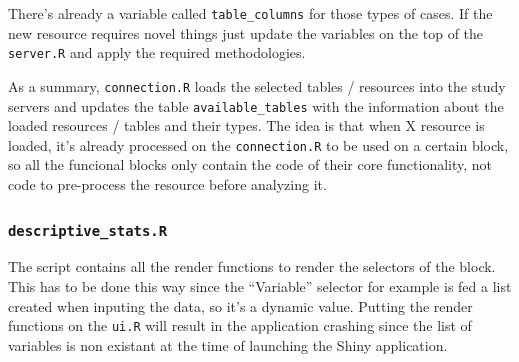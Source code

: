 \documentclass[
]{book}
\newenvironment{Shaded}{\begin{snugshade}}{\end{snugshade}}
\newcommand{\CommentTok}[1]{\textcolor[rgb]{0.56,0.35,0.01}{\textit{#1}}}
\newcommand{\ControlFlowTok}[1]{\textcolor[rgb]{0.13,0.29,0.53}{\textbf{#1}}}
\newcommand{\DataTypeTok}[1]{\textcolor[rgb]{0.13,0.29,0.53}{#1}}
\newcommand{\ErrorTok}[1]{\textcolor[rgb]{0.64,0.00,0.00}{\textbf{#1}}}
\newcommand{\KeywordTok}[1]{\textcolor[rgb]{0.13,0.29,0.53}{\textbf{#1}}}
\newcommand{\NormalTok}[1]{#1}
\newcommand{\OperatorTok}[1]{\textcolor[rgb]{0.81,0.36,0.00}{\textbf{#1}}}
\newcommand{\StringTok}[1]{\textcolor[rgb]{0.31,0.60,0.02}{#1}}
\begin{document}
\begin{Shaded}
\end{Shaded}

There's already a variable called \texttt{table\_columns} for those types of cases. If the new resource requires novel things just update the variables on the top of the \texttt{server.R} and apply the required methodologies.

As a summary, \texttt{connection.R} loads the selected tables / resources into the study servers and updates the table \texttt{available\_tables} with the information about the loaded resources / tables and their types. The idea is that when X resource is loaded, it's already processed on the \texttt{connection.R} to be used on a certain block, so all the funcional blocks only contain the code of their core functionality, not code to pre-process the resource before analyzing it.

\hypertarget{descriptive_stats.r}{%
\subsubsection{\texorpdfstring{\texttt{descriptive\_stats.R}}{descriptive\_stats.R}}\label{descriptive_stats.r}}

The script contains all the render functions to render the selectors of the block. This has to be done this way since the ``Variable'' selector for example is fed a list created when inputing the data, so it's a dynamic value. Putting the render functions on the \texttt{ui.R} will result in the application crashing since the list of variables is non existant at the time of launching the Shiny application.
\end{document}
